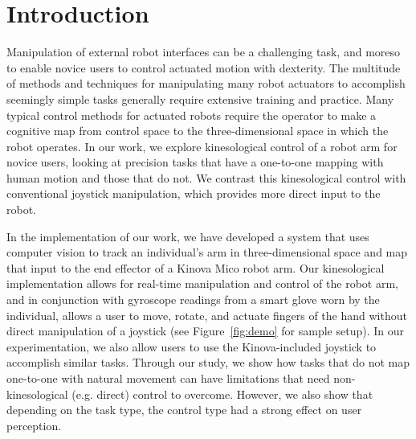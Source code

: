 \documentclass{sigchi}
\begin{document}


\section{Introduction}

Manipulation of external robot interfaces can be a challenging task, and moreso to enable novice users to control actuated motion with dexterity.  The multitude of methods and techniques for manipulating many robot actuators to accomplish seemingly simple tasks generally require extensive training and practice.  Many typical control methods for actuated robots require the operator to make a cognitive map from control space to the three-dimensional space in which the robot operates.  In our work, we explore kinesological control of a robot arm for novice users, looking at precision tasks that have a one-to-one mapping with human motion and those that do not.  We contrast this kinesological control with conventional joystick manipulation, which provides more direct input to the robot.  

In the implementation of our work, we have developed a system that uses computer vision to track an individual's arm in three-dimensional space and map that input to the end effector of a Kinova Mico robot arm.  Our kinesological implementation allows for real-time manipulation and control of the robot arm, and in conjunction with gyroscope readings from a smart glove worn by the individual, allows a user to move, rotate, and actuate fingers of the hand without direct manipulation of a joystick (see Figure~\ref{fig:demo} for sample setup). In our experimentation, we also allow users to use the Kinova-included joystick to accomplish similar tasks. Through our study, we show how tasks that do not map one-to-one with natural movement can have limitations that need non-kinesological (e.g. direct) control to overcome.  However, we also show that depending on the task type, the control type had a strong effect on user perception.
\end{document}
